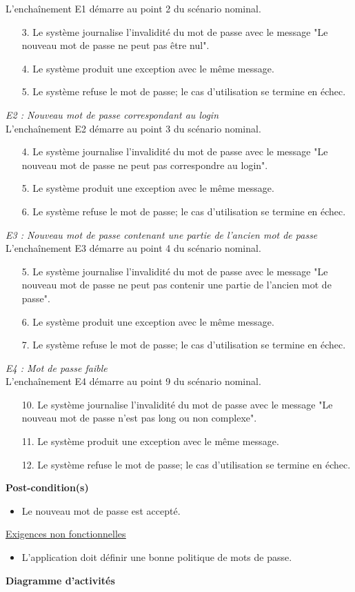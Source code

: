 L’enchaînement E1 démarre au point 2 du scénario nominal.
\begin{itemize}
	\item[3.] Le système journalise l'invalidité du mot de passe avec le message "Le nouveau mot de passe ne peut pas être nul".
	\item[4.] Le système produit une exception avec le même message.
	\item[5.] Le système refuse le mot de passe; le cas d'utilisation se termine en échec.
\end{itemize}
\textit{E2 : Nouveau mot de passe correspondant au login}\\
L’enchaînement E2 démarre au point 3 du scénario nominal.
\begin{itemize}
	\item[4.] Le système journalise l'invalidité du mot de passe avec le message "Le nouveau mot de passe ne peut pas correspondre au login".
	\item[5.] Le système produit une exception avec le même message.
	\item[6.] Le système refuse le mot de passe; le cas d'utilisation se termine en échec.
\end{itemize}
\textit{E3 : Nouveau mot de passe contenant une partie de l'ancien mot de passe}\\
L’enchaînement E3 démarre au point 4 du scénario nominal.
\begin{itemize}
	\item[5.] Le système journalise l'invalidité du mot de passe avec le message "Le nouveau mot de passe ne peut pas contenir une partie de l'ancien mot de passe".
	\item[6.] Le système produit une exception avec le même message.
	\item[7.] Le système refuse le mot de passe; le cas d'utilisation se termine en échec.
\end{itemize}
\textit{E4 : Mot de passe faible}\\
L’enchaînement E4 démarre au point 9 du scénario nominal.
\begin{itemize}
	\item[10.] Le système journalise l'invalidité du mot de passe avec le message "Le nouveau mot de passe n'est pas long ou non complexe".
	\item[11.] Le système produit une exception avec le même message.
	\item[12.] Le système refuse le mot de passe; le cas d'utilisation se termine en échec.
\end{itemize}
\textbf{Post-condition(s)}
\begin{itemize}
	\item Le nouveau mot de passe est accepté.
\end{itemize}
\underline{\underline{Exigences non fonctionnelles}}
\begin{itemize}
	\item L’application doit définir une bonne politique de mots de passe.\\
\end{itemize}
\textbf{\RIGHTarrow Diagramme d'activités}\\

